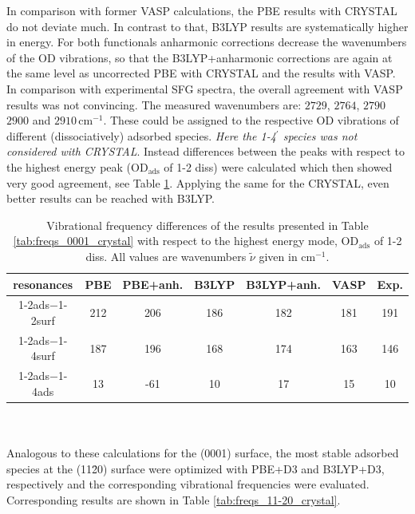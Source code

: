 \documentclass[11pt,DIV=13,BCOR=5mm,a4paper,headinclude]{scrbook}
\begin{document}
In comparison with former VASP calculations, the PBE results with CRYSTAL do not deviate much.
In contrast to that, B3LYP results are systematically higher in energy.
For both functionals anharmonic corrections decrease the wavenumbers of the OD vibrations, so that the B3LYP+anharmonic corrections are again at the same level as uncorrected PBE with CRYSTAL and the results with VASP.
In comparison with experimental SFG spectra\cite{Wirth2014}, the overall agreement with VASP results was not convincing.
The measured wavenumbers are: $2729$, $2764$, $2790$ $2900$ and $2910\,$cm$^{-1}$.
These could be assigned to the respective OD vibrations of different (dissociatively) adsorbed species.
\textit{Here the 1-4$^\prime$ species was not considered with CRYSTAL}.
Instead differences between the peaks with respect to the highest energy peak (OD$_\textrm{ads}$ of 1-2 diss) were calculated which then showed very good agreement, see Table \ref{tab:freqs_0001_crystal-relative}.
Applying the same for the CRYSTAL, even better results can be reached with B3LYP.
\begin{table}[!h]
  \centering
  \caption{Vibrational frequency differences of the results presented in Table \ref{tab:freqs_0001_crystal} with respect to the highest energy mode, OD$_\textrm{ads}$ of 1-2 diss.
All values are wavenumbers $\tilde{\nu}$ given in cm$^{-1}$.}
  \begin{tabular}{c|cc|cc|c|c}
  \toprule
   resonances& PBE & PBE+anh.
& B3LYP & B3LYP+anh.
&VASP&Exp.\\\midrule
  1-2ads$-$1-2surf&212 &206 &186 &182 &181 &191 \\
  1-2ads$-$1-4surf&187 &196 &168 &174 &163 &146 \\
  1-2ads$-$1-4ads &13 &-61 &10 &17 &15 &10 \\\bottomrule
    \end{tabular}
  \label{tab:freqs_0001_crystal-relative}
\end{table}
\\\\
Analogous to these calculations for the (0001) surface, the most stable adsorbed species at the (11\=20) surface were optimized with PBE+D3 and B3LYP+D3, respectively and the corresponding vibrational frequencies were evaluated.
Corresponding results are shown in Table \ref{tab:freqs_11-20_crystal}.
\end{document}
